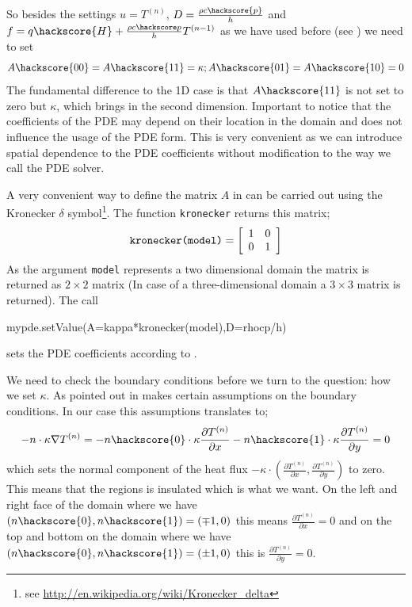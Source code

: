 So besides the settings $u=T^{(n)}$, $D = \frac{\rho c \hackscore{p}}{h}$ and
$f = q \hackscore{H} + \frac{\rho c\hackscore p}{h} T^{(n-1)}$ as we have used
before (see ) we need to set
\begin{equation}\label{eqn: kappa general}
A\hackscore{00}=A\hackscore{11}=\kappa; A\hackscore{01}=A\hackscore{10}=0
\end{equation}
The fundamental difference to the 1D case is that $A\hackscore{11}$ is not set
to zero but $\kappa$,
which brings in the second dimension. Important to notice that the coefficients 
of the PDE may depend on their location in the domain and does not influence the
usage of the PDE form. This is very convenient as we can introduce spatial
dependence to the PDE coefficients without modification to the way we call the
PDE solver. 

A very convenient way to define the matrix $A$ in  can
be carried out using the 
Kronecker $\delta$ symbol\footnote{see
\url{http://en.wikipedia.org/wiki/Kronecker_delta}}. The 
\esc function \verb|kronecker| returns this matrix;
\begin{equation}
\verb|kronecker(model)| = \left[ 
\begin{array}{cc}
 1 & 0 \\
 0 & 1 \\
\end{array}
\right]
\end{equation}
As the argument \verb|model| represents a two dimensional domain the matrix is
returned as $2 \times 2$ matrix
(In case of a three-dimensional domain a $3 \times 3$ matrix is returned). The
call 
\begin{python}
mypde.setValue(A=kappa*kronecker(model),D=rhocp/h)
\end{python}
sets the PDE coefficients according to .  

We need to check the boundary conditions before we turn to the question: how we
set $\kappa$. As
pointed out in  makes certain assumptions on the boundary
conditions. In our case
this assumptions translates to;
\begin{equation}
-n \cdot \kappa \nabla T^{(n)} = 
-n\hackscore{0} \cdot \kappa \frac{\partial T^{(n)}}{\partial x} -
n\hackscore{1} \cdot  \kappa \frac{\partial T^{(n)}}{\partial y} = 0
\label{eq:hom flux}
\end{equation}
which sets the normal component of the heat flux $- \kappa \cdot (\frac{\partial
T^{(n)}}{\partial x}, \frac{\partial T^{(n)}}{\partial y})$ to zero. This means
that the regions is insulated which is what we want. 
On the left and right face of the domain where we have
$(n\hackscore{0},n\hackscore{1} ) = (\mp 1,0)$ 
this means $\frac{\partial T^{(n)}}{\partial x}=0$ and on the top and bottom on
the domain 
where we have  $(n\hackscore{0},n\hackscore{1} ) = (\pm 1,0)$ this is
$\frac{\partial T^{(n)}}{\partial y}=0$. 

